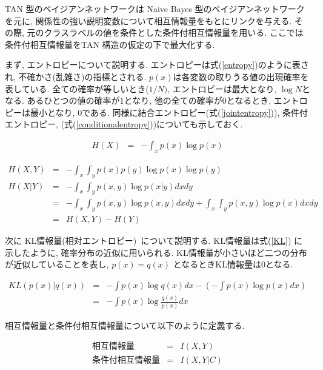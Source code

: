 \documentclass[a4j,12pt]{jarticle}
\begin{document}
TAN 型のベイジアンネットワークは Naive Bayes 型のベイジアンネットワークを元に, 関係性の強い説明変数について相互情報量をもとにリンクを与える. その際, 元のクラスラベルの値を条件とした条件付相互情報量を用いる. ここでは条件付相互情報量をTAN 構造の仮定の下で最大化する.

まず, エントロピーについて説明する. エントロピーは式(\ref{entropy})のように表され, 不確かさ(乱雑さ)の指標とされる. $p(x)$は各変数の取りうる値の出現確率を表している. 全ての確率が等しいとき($1/N)$, エントロピーは最大となり, $\log N$となる. あるひとつの値の確率が$1$となり, 他の全ての確率が$0$となるとき, エントロピーは最小となり, $0$である. 同様に結合エントロピー(式(\ref{jointentropy})), 条件付エントロピー, (式(\ref{conditionalentropy}))についても示しておく.

\begin{eqnarray}
\label{entropy}
H(X) &=& - \int_x p(x) \log p(x) 
\end{eqnarray}

\begin{eqnarray}
\label{jointentropy}
H(X, Y) &=& - \int_x \int_y p(x) p(y) \log p(x) \log p(y) \\
\label{conditionalentropy}
H(X| Y) &=& - \int_x \int_y p(x, y) \log p(x| y) dx dy \nonumber \\
           &=& - \int_x \int_y p(x, y) \log p(x, y) dx dy + \int_x \int_y p(x, y) \log p(x) dx dy \nonumber \\
           &=& H(X, Y) - H(Y)
\end{eqnarray}


次に KL情報量(相対エントロピー)~\cite{Meyer}について説明する. KL情報量は式(\ref{KL}) に示したように, 確率分布の近似に用いられる. KL情報量が小さいほど二つの分布が近似していることを表し, $p(x) = q(x)$ となるときKL情報量は$0$となる.

\begin{eqnarray}
\label{KL}
KL(p(x) | q(x)) &=& - \int p(x) \log q(x) dx - \left(- \int p(x) \log p(x) dx \right) \nonumber \\ 
                    &=& - \int p(x) \log \frac{q(x)}{p(x)} dx
\end{eqnarray}

相互情報量と条件付相互情報量について以下のように定義する.

\begin{eqnarray*}
\mbox{相互情報量} &=& I(X, Y) \\
\mbox{条件付相互情報量} &=& I(X, Y | C)
\end{eqnarray*}
\end{document}
